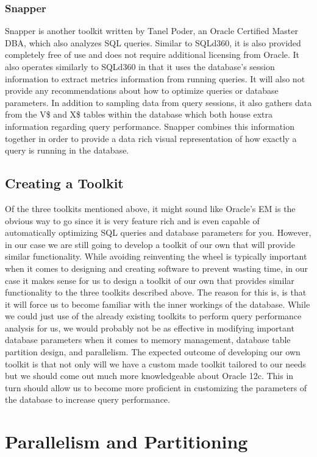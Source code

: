 \documentclass[draftclsnofoot, onecolumn, compsoc, 10pt]{IEEEtran}
\begin{document}
\subsubsection{Snapper}
Snapper is another toolkit written by Tanel Poder, an Oracle Certified Master DBA, which also analyzes SQL queries. 
Similar to SQLd360, it is also provided completely free of use and does not require additional licensing from Oracle. 
It also operates similarly to SQLd360 in that it uses the database’s session information to extract metrics information from running queries. 
It will also not provide any recommendations about how to optimize queries or database parameters. 
In addition to sampling data from query sessions, it also gathers data from the V\$ and X\$ tables within the database which both house extra information regarding query performance. 
Snapper combines this information together in order to provide a data rich visual representation of how exactly a query is running in the database. 

\subsection{Creating a Toolkit}
Of the three toolkits mentioned above, it might sound like Oracle’s EM is the obvious way to go since it is very feature rich and is even capable of automatically optimizing SQL queries and database parameters for you. 
However, in our case we are still going to develop a toolkit of our own that will provide similar functionality. 
While avoiding reinventing the wheel is typically important when it comes to designing and creating software to prevent wasting time, in our case it makes sense for us to design a toolkit of our own that provides similar functionality to the three toolkits described above. 
The reason for this is, is that it will force us to become familiar with the inner workings of the database. 
While we could just use of the already existing toolkits to perform query performance analysis for us, we would probably not be as effective in modifying important database parameters when it comes to memory management, database table partition design, and parallelism. 
The expected outcome of developing our own toolkit is that not only will we have a custom made toolkit tailored to our needs but we should come out much more knowledgeable about Oracle 12c. 
This in turn should allow us to become more proficient in customizing the parameters of the database to increase query performance.


\section{Parallelism and Partitioning}
\end{document}
